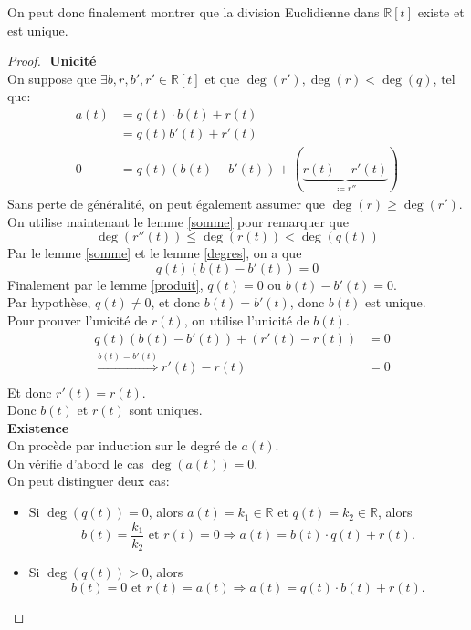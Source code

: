 \documentclass[11pt, a4paper, twoside]{article}
\begin{document}
On peut donc finalement montrer que la division Euclidienne dans $\mathbb{R}[t]$ existe et est unique.
\begin{proof}
$ $\newline
\textbf{Unicité}\\
On suppose que $\exists b,r,b',r' \in \mathbb{R}[t]$ et que $\deg(r'),\deg(r) < \deg(q)$, tel que:
\begin{align*}
	a(t) &= q(t) \cdot b(t) + r(t)\\
	     &= q(t) b'(t) + r'(t)\\
	0 &= q(t)(b(t) - b'(t)) + (\underbrace{  r(t) - r'(t) }_{\coloneqq r''}) 
\end{align*}
Sans perte de généralité, on peut également assumer que $\deg(r) \geq \deg(r')$.\\
On utilise maintenant le lemme \ref{somme} pour remarquer que
\[ 
	\deg(r''(t)) \leq \deg(r(t)) < \deg(q(t))
\]
Par le lemme \ref{somme} et le lemme \ref{degres}, on a que 
\[ 
	q(t)(b(t) - b'(t)) = 0
\]
Finalement par le lemme \ref{produit}, $q(t)=0$ ou $b(t)-b'(t)=0$.\\
Par hypothèse, $q(t)\neq 0$, et donc $b(t) = b'(t) $, donc $b(t)$ est unique.\\
Pour prouver l'unicité de $r(t)$, on utilise l'unicité de $b(t)$.
\begin{align*}
&q(t)(b(t) - b'(t)) + ( r'(t) - r(t)) &= 0\\
&\overset{b(t)=b'(t)}{\Rightarrow}  r'(t) - r(t) &= 0\\
\end{align*}
Et donc $r'(t)=r(t)$.\\
Donc $b(t)$ et $r(t)$ sont uniques.\\

\textbf{Existence}\\
On procède par induction sur le degré de $a(t)$.\\
On vérifie d'abord le cas $\deg(a(t))=0$.\\
On peut distinguer deux cas:
\begin{itemize}
	\item Si $\deg(q(t))=0$, alors $a(t) = k_1 \in \mathbb{R}$ et $q(t) = k_2 \in \mathbb{R}$, alors
\[ 
	b(t) = \frac{k_1}{k_2} \text{ et } r(t)=0 \Rightarrow a(t) = b(t) \cdot q(t) + r(t)
.\]
\item Si $\deg(q(t))> 0$, alors
\[ 
	b(t) = 0  \text{ et } r(t) = a(t) \Rightarrow  a(t) = q(t) \cdot b(t) + r(t)
.\]


\end{itemize}
\end{proof}
\end{document}

